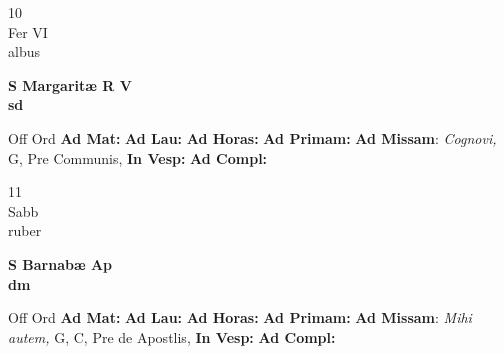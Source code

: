 \documentclass[10pt, openany]{book}
\begin{document}
    \begin{center}
        \begin{minipage}{3.5in}
            \vspace{2em}
            \begin{minipage}{0.5in}
                {\Huge 10} \\
                {\normalsize Fer VI} \\
                {\normalsize albus}
            \end{minipage}
            \begin{minipage}{3.0in}
                \textbf{ \large S Margaritæ R V \\
                \textnormal{\normalsize sd}} \\ 
            \end{minipage}
            \begin{justify}Off Ord
                \textbf{Ad Mat: }
                \textbf{Ad Lau: }
                \textbf{Ad Horas: }
                \textbf{Ad Primam: }\textbf{Ad Missam}: \textit{Cognovi,} G, Pre Communis,  
                \textbf{In Vesp: }
                \textbf{Ad Compl: }
            \end{justify}
        \end{minipage}
    \end{center}

    \begin{center}
        \begin{minipage}{3.5in}
            \vspace{2em}
            \begin{minipage}{0.5in}
                {\Huge 11} \\
                {\normalsize Sabb} \\
                {\normalsize ruber}
            \end{minipage}
            \begin{minipage}{3.0in}
                \textbf{ \large S Barnabæ Ap \\
                \textnormal{\normalsize dm}} \\ 
            \end{minipage}
            \begin{justify}Off Ord
                \textbf{Ad Mat: }
                \textbf{Ad Lau: }
                \textbf{Ad Horas: }
                \textbf{Ad Primam: }\textbf{Ad Missam}: \textit{Mihi autem,} G, C, Pre de Apostlis,  
                \textbf{In Vesp: }
                \textbf{Ad Compl: }
            \end{justify}
        \end{minipage}
    \end{center}
\end{document}
